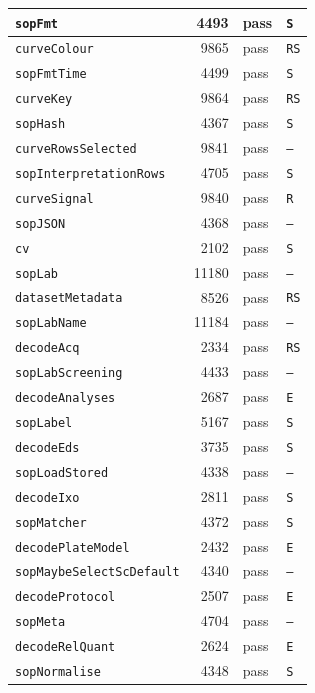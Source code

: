 {\begin{xltabular}{\linewidth}{|l|r|X|X|}
\texttt{sopFmt} & 4493 & pass & \texttt{S} \\ \hline
\texttt{curveColour} & 9865 & pass & \texttt{RS} \\ \hline
\texttt{sopFmtTime} & 4499 & pass & \texttt{S} \\ \hline
\texttt{curveKey} & 9864 & pass & \texttt{RS} \\ \hline
\texttt{sopHash} & 4367 & pass & \texttt{S} \\ \hline
\texttt{curveRowsSelected} & 9841 & pass & \texttt{--} \\ \hline
\texttt{sopInterpretationRows} & 4705 & pass & \texttt{S} \\ \hline
\texttt{curveSignal} & 9840 & pass & \texttt{R} \\ \hline
\texttt{sopJSON} & 4368 & pass & \texttt{--} \\ \hline
\texttt{cv} & 2102 & pass & \texttt{S} \\ \hline
\texttt{sopLab} & 11180 & pass & \texttt{--} \\ \hline
\texttt{datasetMetadata} & 8526 & pass & \texttt{RS} \\ \hline
\texttt{sopLabName} & 11184 & pass & \texttt{--} \\ \hline
\texttt{decodeAcq} & 2334 & pass & \texttt{RS} \\ \hline
\texttt{sopLabScreening} & 4433 & pass & \texttt{--} \\ \hline
\texttt{decodeAnalyses} & 2687 & pass & \texttt{E} \\ \hline
\texttt{sopLabel} & 5167 & pass & \texttt{S} \\ \hline
\texttt{decodeEds} & 3735 & pass & \texttt{S} \\ \hline
\texttt{sopLoadStored} & 4338 & pass & \texttt{--} \\ \hline
\texttt{decodeIxo} & 2811 & pass & \texttt{S} \\ \hline
\texttt{sopMatcher} & 4372 & pass & \texttt{S} \\ \hline
\texttt{decodePlateModel} & 2432 & pass & \texttt{E} \\ \hline
\texttt{sopMaybeSelectScDefault} & 4340 & pass & \texttt{--} \\ \hline
\texttt{decodeProtocol} & 2507 & pass & \texttt{E} \\ \hline
\texttt{sopMeta} & 4704 & pass & \texttt{--} \\ \hline
\texttt{decodeRelQuant} & 2624 & pass & \texttt{E} \\ \hline
\texttt{sopNormalise} & 4348 & pass & \texttt{S} \\ \hline

\end{xltabular}}
